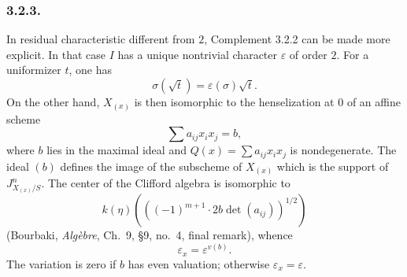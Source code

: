 \subsubsection*{3.2.3.}
In residual characteristic different from $2$, Complement 3.2.2 can
be made more explicit.  In that case $I$ has a unique nontrivial
character $\varepsilon$ of order $2$.  For a uniformizer $t$, one
has
\[
\sigma(\sqrt t)=\varepsilon(\sigma)\sqrt t.
\]
On the other hand, $X_{(x)}$ is then isomorphic to the henselization
at $0$ of an affine scheme
\[
\sum a_{ij}x_ix_j=b,
\]
where $b$ lies in the maximal ideal and
$Q(x)=\sum a_{ij}x_ix_j$ is nondegenerate.  The ideal $(b)$ defines
the image of the subscheme of $X_{(x)}$ which is the support of
$J^n_{X_{(x)}/S}$.  The center of the Clifford algebra is isomorphic
to
\[
k(\eta)\left(\left((-1)^{m+1}\cdot2b\det(a_{ij})\right)^{1/2}\right)
\]
(Bourbaki, \emph{Alg\`ebre}, Ch.~9, \S9, no.~4, final remark), whence
\[
\varepsilon_x=\varepsilon^{v(b)}.
\]
The variation is zero if $b$ has even valuation; otherwise
$\varepsilon_x=\varepsilon$.
